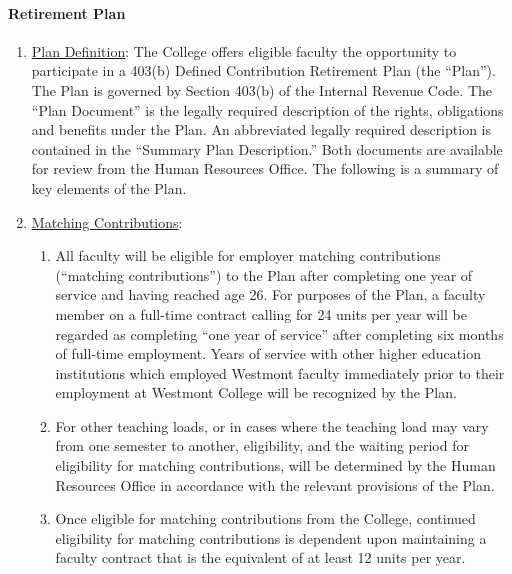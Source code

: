 			\paragraph{Retirement Plan}
				\begin{enumerate}[label=\alph*)]

					\item{\underline{Plan Definition}:  The College offers eligible faculty the
						opportunity to participate in a 403(b) Defined Contribution
						Retirement Plan (the ``Plan'').  The Plan is governed by Section
						403(b) of the Internal Revenue Code.  The ``Plan Document'' is the
						legally required description of the rights, obligations and benefits
						under the Plan.  An abbreviated legally required description is
						contained in the ``Summary Plan Description.''  Both documents are
						available for review from the Human Resources Office.  The following
						is a summary of key elements of the Plan.}

					\item{\underline{Matching Contributions}:

						\begin{enumerate}[label=\arabic*)]

							\item{All faculty will be eligible for employer matching
								contributions (``matching contributions'') to the Plan after
								completing one year of service and having reached age 26.  For
								purposes of the Plan, a faculty member on a full-time contract
								calling for 24 units per year will be regarded as completing
								``one year of service'' after completing six months of full-time
								employment.  Years of service with other higher education
								institutions which employed Westmont faculty immediately prior
								to their employment at Westmont College will be recognized by
								the Plan.}

							\item{For other teaching loads, or in cases where the teaching
								load may vary from one semester to another, eligibility, and the
								waiting period for eligibility for matching contributions, will
								be determined by the Human Resources Office in accordance with
								the relevant provisions of the Plan.}

							\item{Once eligible for matching contributions from
								the College, continued eligibility for matching
								contributions is dependent upon maintaining a
								faculty contract that is the equivalent of at least
								12 units per year.  }


\end{enumerate}}
\end{enumerate}
